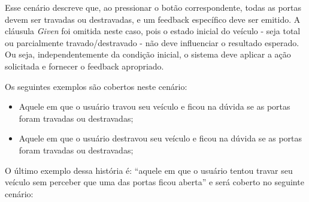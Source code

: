 Esse cenário descreve que, ao pressionar o botão correspondente, todas as portas devem ser travadas ou destravadas, e um feedback específico deve ser emitido. A cláusula \textit{Given} foi omitida neste caso, pois o estado inicial do veículo - seja total ou parcialmente travado/destravado - não deve influenciar 
o resultado esperado. Ou seja, independentemente da condição inicial, o sistema deve aplicar a ação solicitada e fornecer o feedback apropriado.

Os seguintes exemplos são cobertos neste cenário:

\begin{itemize}
    \item Aquele em que o usuário travou seu veículo e ficou na dúvida se as portas foram travadas ou destravadas;
    \item Aquele em que o usuário destravou seu veículo e ficou na dúvida se as portas foram travadas ou destravadas;
\end{itemize}

O último exemplo dessa história é: ``aquele em que o usuário tentou travar seu veículo sem perceber que uma das portas ficou aberta'' e será coberto no seguinte cenário:





